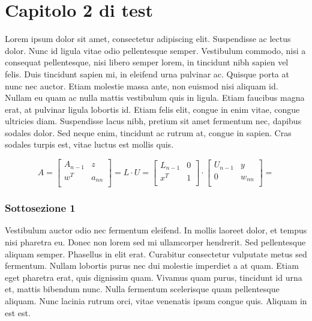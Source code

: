 \chapter{Capitolo 2 di test}
\label{ch:capitolo2}

Lorem ipsum dolor sit amet, consectetur adipiscing elit. Suspendisse ac lectus dolor. Nunc id ligula vitae odio pellentesque semper. Vestibulum commodo, nisi a consequat pellentesque, nisi libero semper lorem, in tincidunt nibh sapien vel felis. Duis tincidunt sapien mi, in eleifend urna pulvinar ac. Quisque porta at nunc nec auctor. Etiam molestie massa ante, non euismod nisi aliquam id. Nullam eu quam ac nulla mattis vestibulum quis in ligula. Etiam faucibus magna erat, at pulvinar ligula lobortis id. Etiam felis elit, congue in enim vitae, congue ultricies diam. Suspendisse lacus nibh, pretium sit amet fermentum nec, dapibus sodales dolor. Sed neque enim, tincidunt ac rutrum at, congue in sapien. Cras sodales turpis est, vitae luctus est mollis quis.

$$ A=
\begin{bmatrix}
A_{n-1} & z \\
w^{T} & a_{nn} \\
\end{bmatrix}
= L\cdot U = 
\begin{bmatrix}
L_{n-1} & 0 \\
x^{T} & 1 \\
\end{bmatrix}
\cdot
\begin{bmatrix}
U_{n-1} & y \\
0 & w_{nn} \\
\end{bmatrix}=$$


\subsection{Sottosezione 1}
\label{subsec:sottosezione1}

Vestibulum auctor odio nec fermentum eleifend. In mollis laoreet dolor, et tempus nisi pharetra eu. Donec non lorem sed mi ullamcorper hendrerit. Sed pellentesque aliquam semper. Phasellus in elit erat. Curabitur consectetur vulputate metus sed fermentum. Nullam lobortis purus nec dui molestie imperdiet a at quam. Etiam eget pharetra erat, quis dignissim quam. Vivamus quam purus, tincidunt id urna et, mattis bibendum nunc. Nulla fermentum scelerisque quam pellentesque aliquam. Nunc lacinia rutrum orci, vitae venenatis ipsum congue quis. Aliquam in est est.

